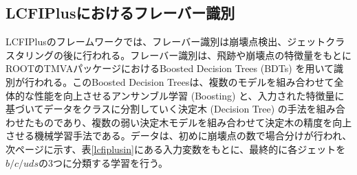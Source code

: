 \subsection{LCFIPlusにおけるフレーバー識別}
LCFIPlusのフレームワークでは、フレーバー識別は崩壊点検出、ジェットクラスタリングの後に行われる。フレーバー識別は、飛跡や崩壊点の特徴量をもとにROOTのTMVAパッケージにおけるBoosted Decision Trees (BDTs) を用いて識別が行われる。このBoosted Decision Treesは、複数のモデルを組み合わせて全体的な性能を向上させるアンサンブル学習 (Boosting) と、入力された特徴量に基づいてデータをクラスに分割していく決定木 (Decision Tree) の手法を組み合わせたものであり、複数の弱い決定木モデルを組み合わせて決定木の精度を向上させる機械学習手法である。データは、初めに崩壊点の数で場合分けが行われ、次ページに示す、表\ref{lcfiplusin}にある入力変数をもとに、最終的に各ジェットを$b/c/uds$の3つに分類する学習を行う。
